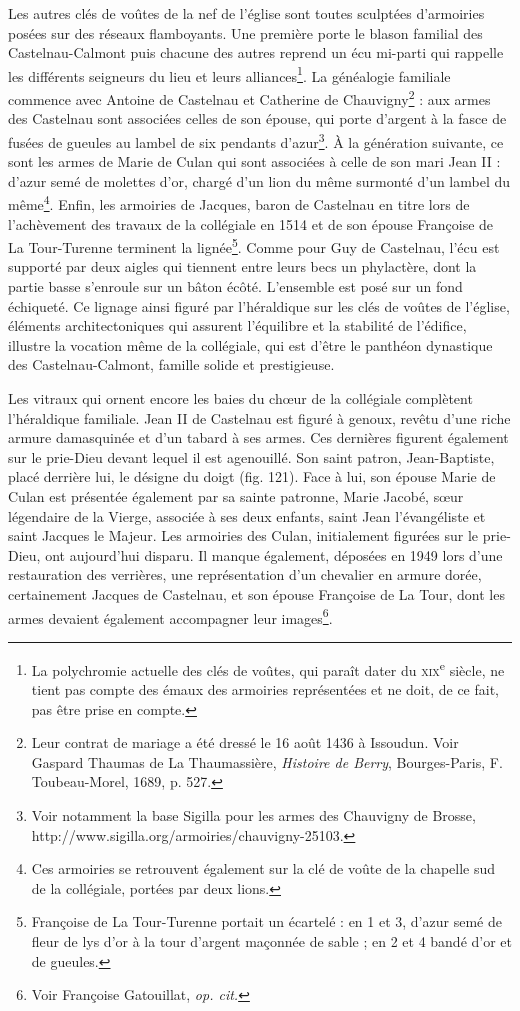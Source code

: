 \documentclass[12pt,twoside,openany]{book}
\begin{document}
Les autres clés de voûtes de la nef de l’église sont toutes sculptées d’armoiries posées sur des réseaux flamboyants. Une première porte le blason familial des Castelnau-Calmont puis chacune des autres reprend un écu mi-parti qui rappelle les différents seigneurs du lieu et leurs alliances\footnote{La polychromie actuelle des clés de voûtes, qui paraît dater du \textsc{xix}\textsuperscript{e} siècle, ne tient pas compte des émaux des armoiries représentées et ne doit, de ce fait, pas être prise en compte.}. La généalogie familiale commence avec Antoine de Castelnau et Catherine de Chauvigny\footnote{Leur contrat de mariage a été dressé le 16 août 1436 à Issoudun. Voir Gaspard Thaumas de La Thaumassière, \textit{Histoire de Berry}, Bourges-Paris, F. Toubeau-Morel, 1689, p. 527.} : aux armes des Castelnau sont associées celles de son épouse, qui porte d’argent à la fasce de fusées de gueules au lambel de six pendants d’azur\footnote{Voir notamment la base Sigilla pour les armes des Chauvigny de Brosse, http://www.sigilla.org/armoiries/chauvigny-25103.}. À la génération suivante, ce sont les armes de Marie de Culan qui sont associées à celle de son mari Jean II : d’azur semé de molettes d’or, chargé d’un lion du même surmonté d’un lambel du même\footnote{Ces armoiries se retrouvent également sur la clé de voûte de la chapelle sud de la collégiale, portées par deux lions.}. Enfin, les armoiries de Jacques, baron de Castelnau en titre lors de l’achèvement des travaux de la collégiale en 1514 et de son épouse Françoise de La Tour-Turenne terminent la lignée\footnote{Françoise de La Tour-Turenne portait un écartelé : en 1 et 3, d’azur semé de fleur de lys d’or à la tour d’argent maçonnée de sable ; en 2 et 4 bandé d’or et de gueules.}. Comme pour Guy de Castelnau, l’écu est supporté par deux aigles qui tiennent entre leurs becs un phylactère, dont la partie basse s’enroule sur un bâton écôté. L’ensemble est posé sur un fond échiqueté. Ce lignage ainsi figuré par l’héraldique sur les clés de voûtes de l’église, éléments architectoniques qui assurent l’équilibre et la stabilité de l’édifice, illustre la vocation même de la collégiale, qui est d’être le panthéon dynastique des Castelnau-Calmont, famille solide et prestigieuse.

Les vitraux qui ornent encore les baies du chœur de la collégiale complètent l’héraldique familiale. Jean II de Castelnau est figuré à genoux, revêtu d’une riche armure damasquinée et d’un tabard à ses armes. Ces dernières figurent également sur le prie-Dieu devant lequel il est agenouillé. Son saint patron, Jean-Baptiste, placé derrière lui, le désigne du doigt (fig. 121). Face à lui, son épouse Marie de Culan est présentée également par sa sainte patronne, Marie Jacobé, sœur légendaire de la Vierge, associée à ses deux enfants, saint Jean l’évangéliste et saint Jacques le Majeur. Les armoiries des Culan, initialement figurées sur le prie-Dieu, ont aujourd’hui disparu. Il manque également, déposées en 1949 lors d’une restauration des verrières, une représentation d’un chevalier en armure dorée, certainement Jacques de Castelnau, et son épouse Françoise de La Tour, dont les armes devaient également accompagner leur images\footnote{Voir Françoise Gatouillat, \textit{op. cit.}}.
\end{document}
